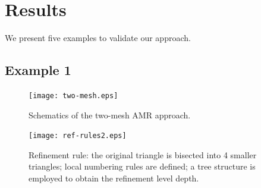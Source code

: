 \documentclass[preprint,10pt]{elsarticle}
\renewcommand{\(}{\left(}
\renewcommand{\)}{\right)}
\renewcommand{\[}{\left[}
\renewcommand{\]}{\right]}
\begin{document}
\section{Results} \label{sec:results}

We present five examples to validate our approach.  

\subsection{Example 1} \label{sec:ex1}





\pagebreak

\begin{figure}[h]
\begin{center}
\texttt{[image: two-mesh.eps]}
\end{center}
\caption{Schematics of the two-mesh AMR approach.}
\label{fig:2-mesh-schematics}
\end{figure}

\pagebreak

\begin{figure}[h]
\begin{center}
\texttt{[image: ref-rules2.eps]}
\end{center}
\caption{Refinement rule: the original triangle is bisected into 4 smaller triangles; 
local numbering rules are defined; a tree structure is employed to obtain the refinement level depth.}
\label{fig:triangle-ref-rule}
\end{figure}
\end{document}
